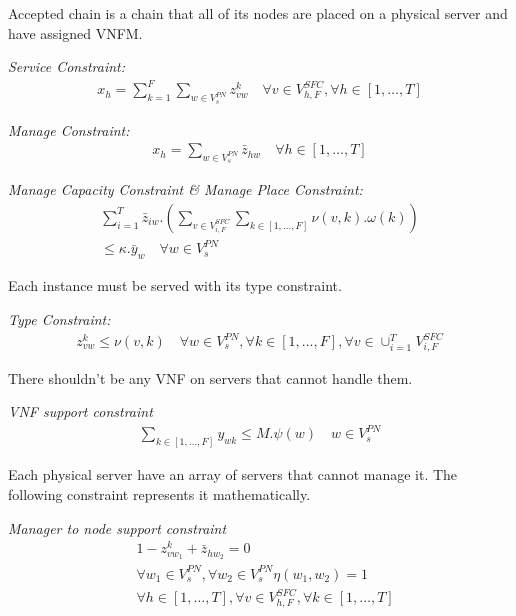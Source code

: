 Accepted chain is a chain that all of its nodes are placed on a physical server and have assigned VNFM.

\textit{Service Constraint:}
\begin{align}
    x_h = \sum_{k=1}^{F} \sum_{w \in V_{s}^{PN}} z_{vw}^{k}
    \quad
    \forall v \in V_{h,F}^{SFC}, \forall h \in [1,\ldots, T]
\end{align}

\textit{Manage Constraint:}
\begin{align}
    x_h = \sum_{w \in V_{s}^{PN}} \bar{z}_{hw}
    \quad
    \forall h \in [1,\ldots, T]
\end{align}

\textit{Manage Capacity Constraint \& Manage Place Constraint:}
\begin{align}
    \sum_{i=1}^{T} \bar{z}_{iw} . \left( \sum_{v \in V_{i, F}^{SFC}} \sum_{k \in [1, \dots, F]} \nu(v, k) . \omega(k) \right) \\ \nonumber
        \le \kappa . \bar{y}_{w}
    \quad
    \forall w \in V_{s}^{PN}
\end{align}

Each instance must be served with its type constraint.

\textit{Type Constraint:}
\begin{align}
    z_{vw}^{k} \le \nu(v, k)
    \quad
    \forall w \in V_{s}^{PN},
    \forall k \in [1,\ldots, F],
    \forall v \in \cup_{i=1}^T V_{i, F}^{SFC}
\end{align}

There shouldn't be any VNF on servers that cannot handle them.

\textit{VNF support constraint}
\begin{align}
    \sum_{k \in [1, \dots, F]} y_{wk} \le M . \psi(w)
    \quad
    w \in V_{s}^{PN}
\end{align}

Each physical server have an array of servers that cannot manage it.
The following constraint represents it mathematically.

\textit{Manager to node support constraint}
\begin{align}
    & 1 - z_{vw_1}^k + \bar{z}_{hw_2} = 0 \nonumber \\
    & \forall w_1 \in V_s^{PN},
    \forall w_2 \in V_s^{PN} \eta(w_1, w_2) = 1 \nonumber \\
    & \forall h \in [1,\dots,T],
    \forall v \in V_{h,F}^{SFC},
    \forall k \in [1,\dots,T]
\end{align}

